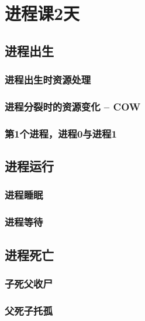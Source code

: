 

\partabstractfp{}
\partabstractrp{}

\part{进程课2天}

\chapter{进程出生}
\section{进程出生时资源处理}
\section{进程分裂时的资源变化 -- COW}
\section{第1个进程，进程0与进程1}

\chapter{进程运行}
\section{进程睡眠}
\section{进程等待}

\chapter{进程死亡}
\section{子死父收尸}
\section{父死子托孤}
\clearpage

